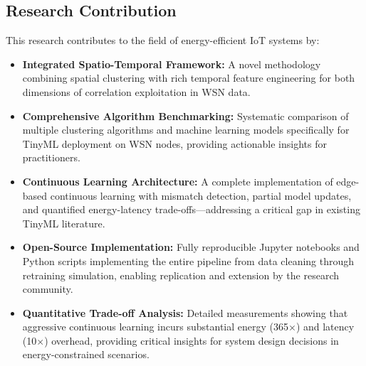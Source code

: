 \documentclass[12pt,a4paper]{article}
\begin{document}
\subsection{Research Contribution}
This research contributes to the field of energy-efficient IoT systems by:
\begin{itemize}
    \item \textbf{Integrated Spatio-Temporal Framework:} A novel methodology combining spatial clustering with rich temporal feature engineering for both dimensions of correlation exploitation in WSN data.

    \item \textbf{Comprehensive Algorithm Benchmarking:} Systematic comparison of multiple clustering algorithms and machine learning models specifically for TinyML deployment on WSN nodes, providing actionable insights for practitioners.

    \item \textbf{Continuous Learning Architecture:} A complete implementation of edge-based continuous learning with mismatch detection, partial model updates, and quantified energy-latency trade-offs—addressing a critical gap in existing TinyML literature.

    \item \textbf{Open-Source Implementation:} Fully reproducible Jupyter notebooks and Python scripts implementing the entire pipeline from data cleaning through retraining simulation, enabling replication and extension by the research community.

    \item \textbf{Quantitative Trade-off Analysis:} Detailed measurements showing that aggressive continuous learning incurs substantial energy (365$\times$) and latency (10$\times$) overhead, providing critical insights for system design decisions in energy-constrained scenarios.
\end{itemize}
\end{document}
